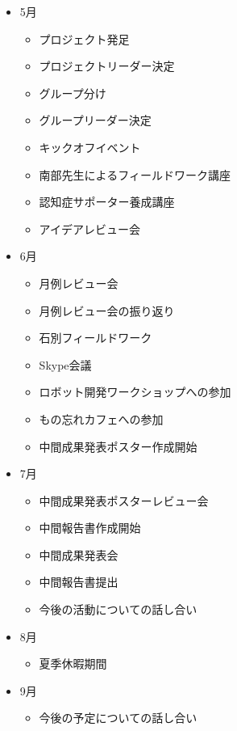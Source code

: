 \documentclass[../report]{subfiles}
\begin{document}
    \begin{itemize}
      \item[] 5月
        \begin{itemize}
          \item プロジェクト発足
          \item プロジェクトリーダー決定
          \item グループ分け
          \item グループリーダー決定
          \item キックオフイベント
          \item 南部先生によるフィールドワーク講座
          \item 認知症サポーター養成講座
          \item アイデアレビュー会
        \end{itemize}
      \item[] 6月
        \begin{itemize}
          \item 月例レビュー会
          \item 月例レビュー会の振り返り
          \item 石別フィールドワーク
          \item Skype会議
          \item ロボット開発ワークショップへの参加
          \item もの忘れカフェへの参加
          \item 中間成果発表ポスター作成開始
        \end{itemize}
      \item[] 7月
        \begin{itemize}
          \item 中間成果発表ポスターレビュー会
          \item 中間報告書作成開始
          \item 中間成果発表会
          \item 中間報告書提出
          \item 今後の活動についての話し合い
        \end{itemize}
      \item[] 8月
        \begin{itemize}
          \item 夏季休暇期間
        \end{itemize}
      \item[] 9月
        \begin{itemize}
          \item 今後の予定についての話し合い

\end{itemize}
\end{itemize}
\end{document}
